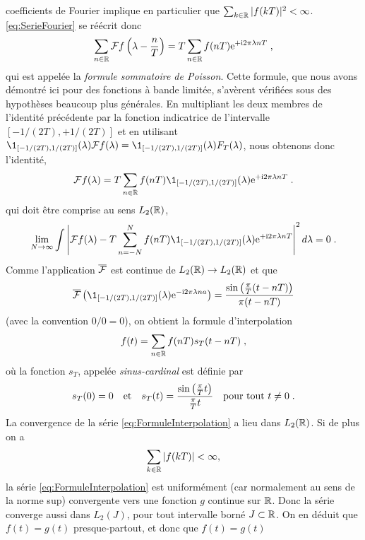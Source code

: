 coefficients de Fourier implique en particulier que $\sum_{k \in \mathbb{R}} |f(kT)|^2 < \infty$. \eqref{eq:SerieFourier} se r{\'e}{\'e}crit donc
\begin{equation}
\label{eq:FormuleSommatoirePoisson}
\sum_{n \in \mathbb{R}} \mathcal{F} f \left( \lambda - \frac{n}{T} \right)  = T \sum_{n \in \mathbb{R}} f(nT) \mathrm{e}^{+ \mathrm{i} 2 \pi \lambda n T}\;,
\end{equation}
qui est appel{\'e}e la \emph{formule sommatoire de Poisson}. Cette formule, que nous avons d{\'e}montr{\'e} ici pour des fonctions {\`a} bande limit{\'e}e, s'av{\`e}rent v{\'e}rifi{\'e}es
sous des hypoth{\`e}ses beaucoup plus g{\'e}n{\'e}rales. En multipliant les deux membres de l'identit{\'e} pr{\'e}c{\'e}dente par la fonction indicatrice de l'intervalle
$[-1/(2T),+1/(2T)]$ et en utilisant $\1_{[-1/(2T),1/(2T)]}(\lambda) \TF f (\lambda)= \1_{[-1/(2T),1/(2T)]}(\lambda) F_T(\lambda)$,
nous obtenons donc l'identit{\'e},
$$
\TF f (\lambda) = T \sum_{n \in \zset} f(nT) \1_{[-1/(2T),1/(2T)]}(\lambda) \rme^{+ \rmi 2 \pi \lambda n T} \eqsp.
$$
qui doit {\^e}tre comprise au sens $L_2(\mathbb{R})$,
$$
\lim_{N \to \infty} \int \left | \TF f(\lambda)  - T \sum_{n =-N}^N f(nT) \1_{[-1/(2T),1/(2T)]}(\lambda) \rme^{+ \rmi 2 \pi
    \lambda n T}  \right|^2 d \lambda = 0 \eqsp.
$$
Comme l'application $\overline{\mathcal{F}}$ est continue de $L_2(\mathbb{R}) \to L_2(\mathbb{R})$ et que
$$
\TFAC{\1_{[-1/(2T),1/(2T)]}(\lambda) \rme^{- \rmi 2 \pi \lambda n a}}= \frac{\sin\left( \frac{\pi}{T}(t - nT)\right)}{\pi(t-nT)}
$$
(avec la convention $0/0=0$), on obtient la formule d'interpolation
\begin{equation}
\label{eq:FormuleInterpolation}
f(t) = \sum_{n \in \mathbb{R}} f(nT) s_T(t-nT)  \;,
\end{equation}
o{\`u} la fonction $s_T$, appel{\'e}e \emph{sinus-cardinal} est d{\'e}finie par
\begin{equation}
\label{eq:SinusCardinal}
s_T(0)=0\quad\text{et}\quad s_T(t) = \frac{\sin \left( \frac{\pi}{T} t\right) }{ \frac{\pi}{T} t}\quad\text{pour tout $t\neq0$} \;.
\end{equation}
La convergence de la s{\'e}rie \eqref{eq:FormuleInterpolation} a lieu dans $L_2(\mathbb{R})$. Si de plus on a
$$
\sum_{k \in \mathbb{R}} |f(kT)| < \infty,
$$
la s{\'e}rie \eqref{eq:FormuleInterpolation} est uniform{\'e}ment (car normalement au sens de la norme sup) convergente vers une
fonction $g$ continue sur $\mathbb{R}$. Donc la
s{\'e}rie converge aussi dans $L_2(J)$, pour tout intervalle born{\'e} $J \subset \mathbb{R}$. On en d{\'e}duit que $f(t)= g(t)$ presque-partout, et donc que $f(t)= g(t)$
